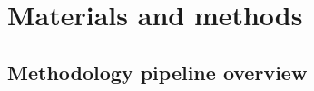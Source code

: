 \documentclass[review]{elsarticle}
\begin{document}


\section{Materials and methods}
\subsection{Methodology pipeline overview}

\end{document}
